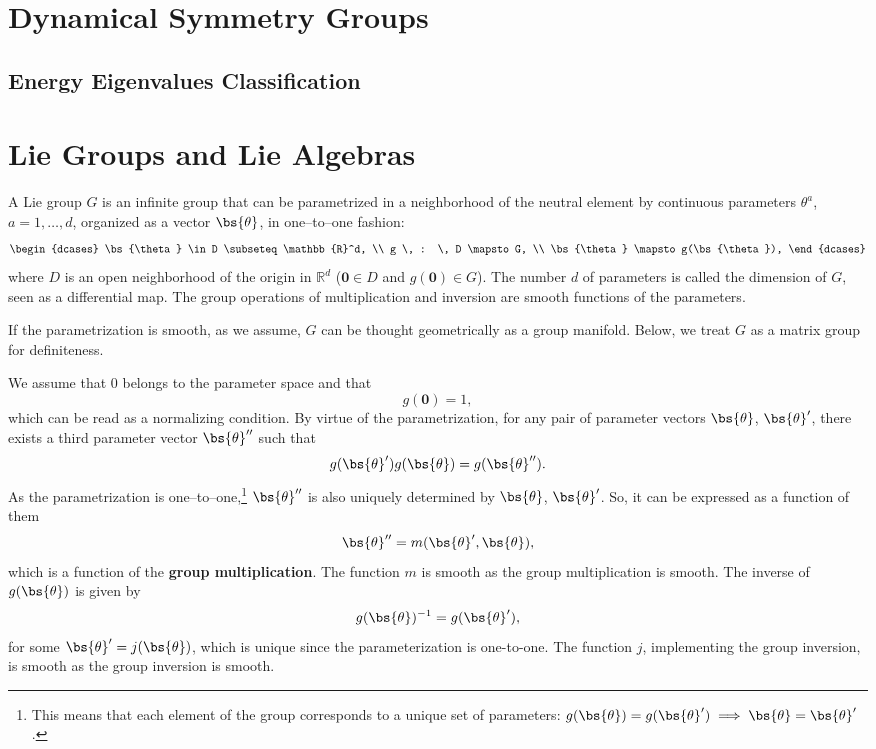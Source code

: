 \section{Dynamical Symmetry Groups}

\subsection{Energy Eigenvalues Classification}



\section{Lie Groups and Lie Algebras}

A Lie group \(G\) is an infinite group that can be parametrized in a neighborhood of the neutral element by continuous parameters \(\theta^a\), \(a = 1, \ldots, d\), organized as a vector \(\bs{\theta}\), in one–to–one fashion:
\[
    \begin{dcases}
        \bs{\theta} \in D \subseteq \mathbb{R}^d, \\
        g \, : \, D \mapsto G,                    \\
        \bs{\theta} \mapsto g(\bs{\theta}),
    \end{dcases}
\]
where \(D\) is an open neighborhood of the origin in \(\mathbb{R}^d\) (\(\mathbf{0}\in D\) and \(g(\mathbf{0}) \in G\)). The number \(d\) of parameters is called the dimension of \(G\), seen as a differential map. The group operations of multiplication and inversion are smooth functions of the parameters.

If the parametrization is smooth, as we assume, \(G\) can be thought geometrically as a group manifold. Below, we treat \(G\) as a matrix group for definiteness.

We assume that 0 belongs to the parameter space and that
\[
    g(\mathbf{0}) = 1,
\]
which can be read as a normalizing condition. By virtue of the parametrization, for any pair of parameter vectors \(\bs{\theta}\), \(\bs{\theta}'\), there exists a third parameter vector \(\bs{\theta}''\) such that
\[
    g(\bs{\theta}') g(\bs{\theta}) = g(\bs{\theta}'').
\]
As the parametrization is one–to–one,\footnote{This means that each element of the group corresponds to a unique set of parameters: \(g(\bs{\theta})=g(\bs{\theta}') \implies \bs{\theta} = \bs{\theta}'\).} \(\bs{\theta}''\) is also uniquely determined by \(\bs{\theta}\), \(\bs{\theta}'\).
So, it can be expressed as a function of them
\[
    \bs{\theta}'' = m(\bs{\theta}', \bs{\theta}),
\]
which is a function of the \textbf{group multiplication}. The function \(m\) is smooth as the group multiplication is smooth. The inverse of \(g(\bs{\theta})\) is given by
\[
    g(\bs{\theta})^{-1} = g(\bs{\theta}'),
\]
for some \(\bs{\theta}' = j(\bs{\theta})\), which is unique since the parameterization is one-to-one. The function \(j\), implementing the group inversion, is smooth as the group inversion is smooth.

